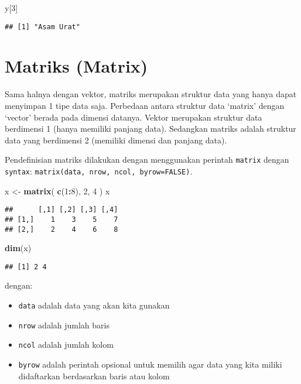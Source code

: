 \documentclass[
]{book}
\newenvironment{Shaded}{\begin{snugshade}}{\end{snugshade}}
\newcommand{\DecValTok}[1]{\textcolor[rgb]{0.00,0.00,0.81}{#1}}
\newcommand{\KeywordTok}[1]{\textcolor[rgb]{0.13,0.29,0.53}{\textbf{#1}}}
\newcommand{\NormalTok}[1]{#1}
\newcommand{\OperatorTok}[1]{\textcolor[rgb]{0.81,0.36,0.00}{\textbf{#1}}}
\newcommand{\StringTok}[1]{\textcolor[rgb]{0.31,0.60,0.02}{#1}}
\providecommand{\tightlist}{%
  \setlength{\itemsep}{0pt}\setlength{\parskip}{0pt}}
\begin{document}
\begin{Shaded}
\begin{Highlighting}[]
\NormalTok{y[}\DecValTok{3}\NormalTok{]}
\end{Highlighting}
\end{Shaded}

\begin{verbatim}
## [1] "Asam Urat"
\end{verbatim}

\hypertarget{matrix}{%
\section{Matriks (Matrix)}\label{matrix}}

Sama halnya dengan vektor, matriks merupakan struktur data yang hanya dapat menyimpan 1 tipe data saja. Perbedaan antara struktur data `matrix' dengan `vector' berada pada dimensi datanya. Vektor merupakan struktur data berdimensi 1 (hanya memiliki panjang data). Sedangkan matriks adalah struktur data yang berdimensi 2 (memiliki dimensi dan panjang data).

Pendefinisian matriks dilakukan dengan menggunakan perintah \texttt{matrix} dengan \texttt{syntax}: \texttt{matrix(data,\ nrow,\ ncol,\ byrow=FALSE)}.

\begin{Shaded}
\begin{Highlighting}[]
\NormalTok{x <-}\StringTok{ }\KeywordTok{matrix}\NormalTok{(}
  \KeywordTok{c}\NormalTok{(}\DecValTok{1}\OperatorTok{:}\DecValTok{8}\NormalTok{), }\DecValTok{2}\NormalTok{, }\DecValTok{4}
\NormalTok{)}
\NormalTok{x}
\end{Highlighting}
\end{Shaded}

\begin{verbatim}
##      [,1] [,2] [,3] [,4]
## [1,]    1    3    5    7
## [2,]    2    4    6    8
\end{verbatim}

\begin{Shaded}
\begin{Highlighting}[]
\KeywordTok{dim}\NormalTok{(x)}
\end{Highlighting}
\end{Shaded}

\begin{verbatim}
## [1] 2 4
\end{verbatim}

dengan:

\begin{itemize}
\tightlist
\item
  \texttt{data} adalah data yang akan kita gunakan
\item
  \texttt{nrow} adalah jumlah baris
\item
  \texttt{ncol} adalah jumlah kolom
\item
  \texttt{byrow} adalah perintah opsional untuk memilih agar data yang kita miliki didaftarkan berdasarkan baris atau kolom
\end{itemize}
\end{document}
